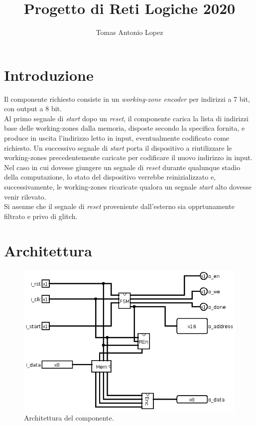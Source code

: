 \documentclass[11pt,a4paper]{article}
\title{\textbf{Progetto di Reti Logiche 2020}}
\author{Tomas Antonio Lopez}
\begin{document}
\maketitle
\tableofcontents
\listoffigures

\newpage

\section{Introduzione}
Il componente richiesto consiste in un \emph{working-zone encoder} per indirizzi a 7 bit, con output a 8 bit.\\
Al primo segnale di \emph{start} dopo un \emph{reset}, il componente carica la lista di indirizzi base delle working-zones dalla memoria, disposte
secondo la specifica fornita, e produce in uscita l'indirizzo letto in input, eventualmente codificato come richiesto. Un successivo segnale di
\emph{start} porta il dispositivo a riutilizzare le working-zones precedentemente caricate per codificare il nuovo indirizzo in input. Nel caso in cui
dovesse giungere un segnale di \emph{reset} durante qualunque stadio della computazione, lo stato del dispositivo verrebbe reinizializzato e,
successivamente, le working-zones ricaricate qualora un segnale \emph{start} alto dovesse venir rilevato.\\
Si assume che il segnale di \emph{reset} proveniente dall'esterno sia opprtunamente filtrato e privo di glitch.

\section{Architettura}
\begin{figure}[ht]
    \includegraphics[scale=0.65]{component.png}
    \caption[Il componente]{Architettura del componente.}
\end{figure}
\end{document}
